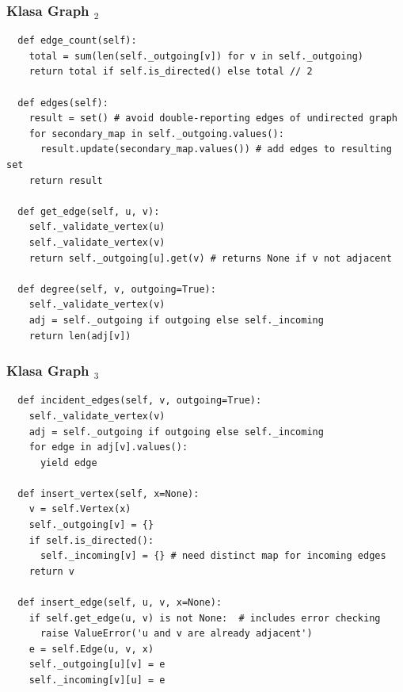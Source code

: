 \documentclass[compress,aspectratio=169]{beamer}
\begin{document}
\begin{frame}
  \frametitle{Klasa Graph $_2$}
\begin{verbatim}
  def edge_count(self):
    total = sum(len(self._outgoing[v]) for v in self._outgoing)
    return total if self.is_directed() else total // 2

  def edges(self):
    result = set() # avoid double-reporting edges of undirected graph
    for secondary_map in self._outgoing.values():
      result.update(secondary_map.values()) # add edges to resulting set
    return result

  def get_edge(self, u, v):
    self._validate_vertex(u)
    self._validate_vertex(v)
    return self._outgoing[u].get(v) # returns None if v not adjacent

  def degree(self, v, outgoing=True):   
    self._validate_vertex(v)
    adj = self._outgoing if outgoing else self._incoming
    return len(adj[v])
\end{verbatim}
\end{frame}

\begin{frame}
  \frametitle{Klasa Graph $_3$}
\begin{verbatim}
  def incident_edges(self, v, outgoing=True):   
    self._validate_vertex(v)
    adj = self._outgoing if outgoing else self._incoming
    for edge in adj[v].values():
      yield edge

  def insert_vertex(self, x=None):
    v = self.Vertex(x)
    self._outgoing[v] = {}
    if self.is_directed():
      self._incoming[v] = {} # need distinct map for incoming edges
    return v
      
  def insert_edge(self, u, v, x=None):
    if self.get_edge(u, v) is not None:  # includes error checking
      raise ValueError('u and v are already adjacent')
    e = self.Edge(u, v, x)
    self._outgoing[u][v] = e
    self._incoming[v][u] = e
\end{verbatim}
\end{frame}
\end{document}
